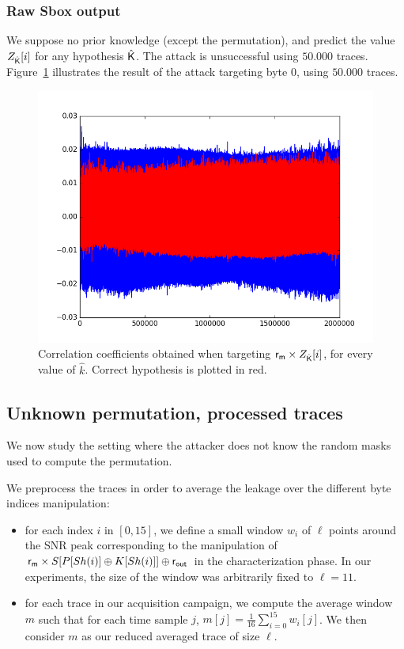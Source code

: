 \subsubsection{Raw Sbox output}
We suppose no prior knowledge (except the permutation), and predict the value $Z_{\hat{\mathsf{K}}}[i]$ for any hypothesis $\hat{\mathsf{K}}$.
The attack is unsuccessful using $50.000$ traces.
Figure~\ref{fig:CPA1O_trickedZ1} illustrates the result of the attack targeting byte 0, using $50.000$ traces.

\begin{figure}[H]
	\centering 
	\includegraphics[scale=0.4]{figures/CPA1O_2Mpts_trickedS0traces.png}
	\caption{Correlation coefficients obtained when targeting $\mathsf{r_m} \times Z_{\hat{\mathsf{K}}}[i]$, for every value of $\hat{k}$. Correct hypothesis is plotted  in red. }
	\label{fig:CPA1O_trickedZ1}
\end{figure}

\subsection{Unknown permutation, processed traces}
We now study the setting where the attacker does not know the random masks used to compute the permutation.

We preprocess the traces in order to average the leakage over the different byte indices manipulation:
\begin{itemize}
	\item for each index $i$ in $[0,15]$, we define a small window $w_i$ of $\ell$ points around the SNR peak corresponding to the manipulation of $\mathsf{r_m} \times S[P[Sh(i)] \oplus K[Sh(i)]]\oplus \mathsf{r_{out}}$ in the characterization phase. In our experiments, the size of the window was arbitrarily fixed to $\ell=11$.
	\item for each trace in our acquisition campaign, we compute the average window $m$ such that for each time sample $j$, $m[j]=\frac{1}{16}\sum_{i=0}^{15} w_i[j]$. We then consider $m$ as our reduced averaged trace of size $\ell$.
\end{itemize}

